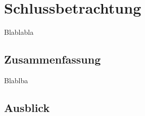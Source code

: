 \chapter{Schlussbetrachtung }
\label{chapter:schlussbetrachtung}


Blablabla 


\section{Zusammenfassung}
\label{section:zusammenfassung}

Blablba

\section{Ausblick}
\label{section:ausblick}


